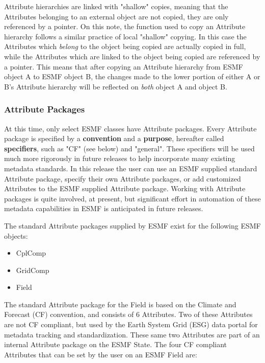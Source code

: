 Attribute hierarchies are linked with "shallow" copies, meaning that the Attributes belonging to an external object are not copied, they are only referenced by a pointer.  On this note, the function used to copy an Attribute hierarchy follows a similar practice of local "shallow" copying.  In this case the Attributes which {\it belong} to the object being copied are actually copied in full, while the Attributes which are linked to the object being copied are referenced by a pointer.  This means that after copying an Attribute hierarchy from ESMF object A to ESMF object B, the changes made to the lower portion of either A or B's Attribute hierarchy will be reflected on {\it both} object A and object B.

\subsubsection{Attribute Packages}

At this time, only select ESMF classes have Attribute packages.  Every Attribute package is specified by a {\bf convention} and a {\bf purpose}, hereafter called {\bf specifiers}, such as "CF" (see below) and "general".  These specifiers will be used much more rigorously in future releases to help incorporate many existing metadata standards.  In this release the user can use an ESMF supplied standard Attribute package, specify their own Attribute packages, or add customized Attributes to the ESMF supplied Attribute package.  Working with Attribute packages is quite involved, at present, but significant effort in automation of these metadata capabilities in ESMF is anticipated in future releases. 

The standard Attribute packages supplied by ESMF exist for the following ESMF objects:

\begin{itemize}
\item CplComp
\item GridComp
\item Field
\end{itemize}

The standard Attribute package for the Field is based on the Climate and Forecast (CF) convention, and consists of 6 Attributes.  Two of these Attributes are not CF compliant, but used by the Earth System Grid (ESG) data portal for metadata tracking and standardization.  These same two Attributes are part of an internal Attribute package on the ESMF State.  The four CF compliant Attributes that can be set by the user on an ESMF Field are:

